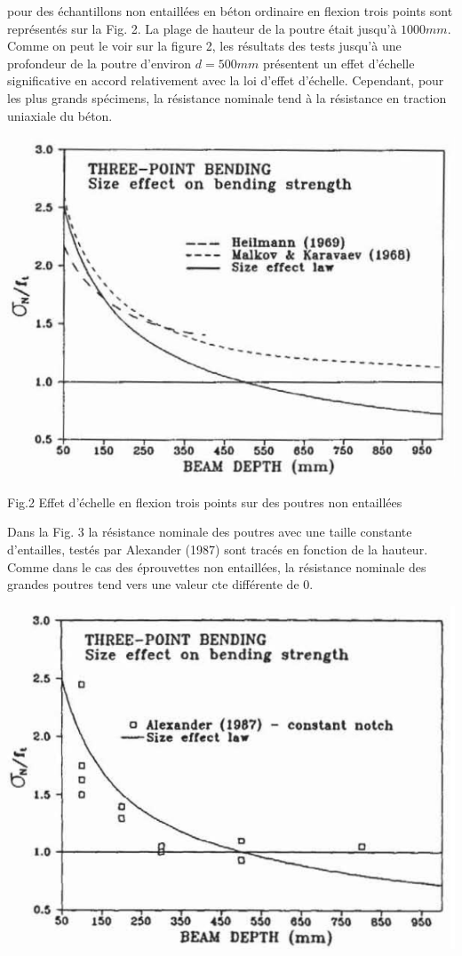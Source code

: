 \documentclass[12pt]{report}
\begin{document}
pour des échantillons non entaillées en béton ordinaire en flexion trois points sont représentés sur
la Fig. 2. La plage de hauteur de la poutre était jusqu'à $1000 mm$. Comme on peut le voir sur la
figure 2, les résultats des tests jusqu'à une profondeur de la poutre d'environ $d = 500 mm$
présentent un effet d'échelle significative en accord relativement avec la loi d'effet d'échelle.
Cependant, pour les plus grands spécimens, la résistance nominale tend à la résistance en traction
uniaxiale du béton.
\begin{center}
\includegraphics[scale=0.65]{Fig_2}
\end{center}
\begin{center}
\caption{Fig.2 Effet d'échelle en flexion trois points sur des poutres non entaillées}
\end{center}
Dans la Fig. 3 la résistance nominale des poutres avec une taille constante d'entailles,
testés par Alexander (1987) sont tracés en fonction de la hauteur. Comme dans le cas des
éprouvettes non entaillées, la résistance nominale des grandes poutres tend vers une valeur
cte différente de $0$.
\begin{center}
\includegraphics[scale=0.65]{Fig_3}
\end{center}
\end{document}

